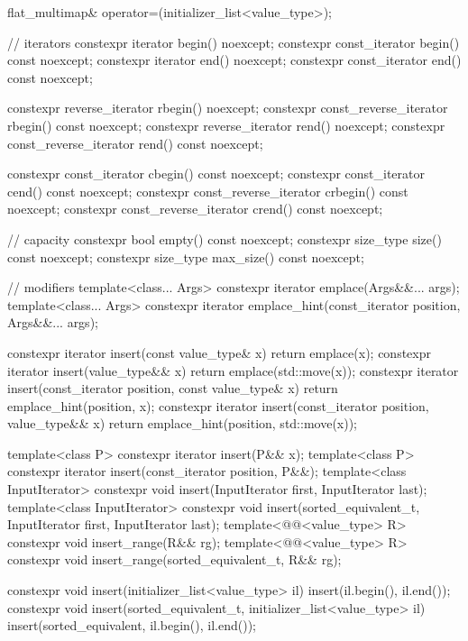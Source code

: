 \begin{codeblock}
{{    flat_multimap& operator=(initializer_list<value_type>);

    // iterators
    constexpr iterator               begin() noexcept;
    constexpr const_iterator         begin() const noexcept;
    constexpr iterator               end() noexcept;
    constexpr const_iterator         end() const noexcept;

    constexpr reverse_iterator       rbegin() noexcept;
    constexpr const_reverse_iterator rbegin() const noexcept;
    constexpr reverse_iterator       rend() noexcept;
    constexpr const_reverse_iterator rend() const noexcept;

    constexpr const_iterator         cbegin() const noexcept;
    constexpr const_iterator         cend() const noexcept;
    constexpr const_reverse_iterator crbegin() const noexcept;
    constexpr const_reverse_iterator crend() const noexcept;

    // capacity
    constexpr bool empty() const noexcept;
    constexpr size_type size() const noexcept;
    constexpr size_type max_size() const noexcept;

    // modifiers
    template<class... Args> constexpr iterator emplace(Args&&... args);
    template<class... Args>
      constexpr iterator emplace_hint(const_iterator position, Args&&... args);

    constexpr iterator insert(const value_type& x)
      { return emplace(x); }
    constexpr iterator insert(value_type&& x)
      { return emplace(std::move(x)); }
    constexpr iterator insert(const_iterator position, const value_type& x)
      { return emplace_hint(position, x); }
    constexpr iterator insert(const_iterator position, value_type&& x)
      { return emplace_hint(position, std::move(x)); }

    template<class P> constexpr iterator insert(P&& x);
    template<class P>
      constexpr iterator insert(const_iterator position, P&&);
    template<class InputIterator>
      constexpr void insert(InputIterator first, InputIterator last);
    template<class InputIterator>
      constexpr void insert(sorted_equivalent_t, InputIterator first, InputIterator last);
    template<@@<value_type> R>
      constexpr void insert_range(R&& rg);
    template<@@<value_type> R>
      constexpr void insert_range(sorted_equivalent_t, R&& rg);

    constexpr void insert(initializer_list<value_type> il)
      { insert(il.begin(), il.end()); }
    constexpr void insert(sorted_equivalent_t, initializer_list<value_type> il)
      { insert(sorted_equivalent, il.begin(), il.end()); }

}}
\end{codeblock}
